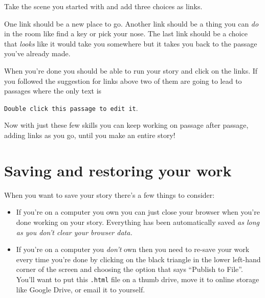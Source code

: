 \documentclass[a5paper,11pt]{article}
\begin{document}
\begin{framed}
  Take the scene you started with and add three choices as links.

  One link should be a new place to go. Another link should be a thing you can \emph{do} in the room like find a key or pick your nose. The last link should be a choice that \emph{looks} like it would take you somewhere but it takes you back to the passage you've already made. 
\end{framed}

When you're done you should be able to run your story and click on the links. If you followed the suggestion for links above two of them are going to lead to passages where the only text is

\texttt{Double click this passage to edit it}.

Now with just these few skills you can keep working on passage after passage, adding links as you go, until you make an entire story!

\section{Saving and restoring your work}
When you want to save your story there's a few things to consider:
\begin{itemize}
  \item If you're on a computer you own you can just close your browser when you're done working on your story. Everything has been automatically saved \textit{as long as you don't clear your browser data.}
  \item If you're on a computer you \emph{don't} own then you need to re-save your work every time you're done by clicking on the black triangle in the lower left-hand corner of the screen and choosing the option that says ``Publish to File''. You'll want to put this \verb".html" file on a thumb drive, move it to online storage like Google Drive, or email it to yourself.
  \end{itemize}
\end{document}
